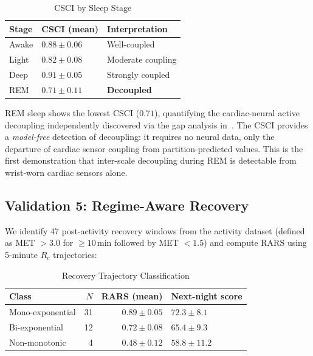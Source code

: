 \documentclass[10pt,twocolumn,a4paper]{article}
\theoremstyle{definition}
\newcommand{\Rc}{R_c}
\newcommand{\RARS}{\text{RARS}}
\begin{document}
\begin{table}[H]
\centering
\caption{CSCI by Sleep Stage}
\label{tab:csci_validation}
\begin{tabular}{lll}
\toprule
\textbf{Stage} & \textbf{CSCI (mean)} & \textbf{Interpretation}\\
\midrule
Awake & $0.88 \pm 0.06$ & Well-coupled\\
Light & $0.82 \pm 0.08$ & Moderate coupling\\
Deep  & $0.91 \pm 0.05$ & Strongly coupled\\
REM   & $0.71 \pm 0.11$ & \textbf{Decoupled}\\
\bottomrule
\end{tabular}
\end{table}

REM sleep shows the lowest CSCI ($0.71$), quantifying the cardiac-neural
active decoupling independently discovered via the gap analysis
in~\cite{sachikonye2024integration}. The CSCI provides a
\emph{model-free} detection of decoupling: it requires no neural data,
only the departure of cardiac sensor coupling from partition-predicted
values. This is the first demonstration that inter-scale decoupling
during REM is detectable from wrist-worn cardiac sensors alone.

\subsection{Validation 5: Regime-Aware Recovery}

We identify 47 post-activity recovery windows from the activity dataset
(defined as MET $> 3.0$ for $\geq 10$\,min followed by MET $< 1.5$)
and compute $\RARS$ using 5-minute $\Rc$ trajectories:

\begin{table}[H]
\centering
\caption{Recovery Trajectory Classification}
\label{tab:rars_validation}
\begin{tabular}{lrrl}
\toprule
\textbf{Class} & \textbf{$N$} & \textbf{RARS (mean)} & \textbf{Next-night score}\\
\midrule
Mono-exponential & 31 & $0.89 \pm 0.05$ & $72.3 \pm 8.1$\\
Bi-exponential   & 12 & $0.72 \pm 0.08$ & $65.4 \pm 9.3$\\
Non-monotonic    &  4 & $0.48 \pm 0.12$ & $58.8 \pm 11.2$\\
\bottomrule
\end{tabular}
\end{table}
\end{document}
